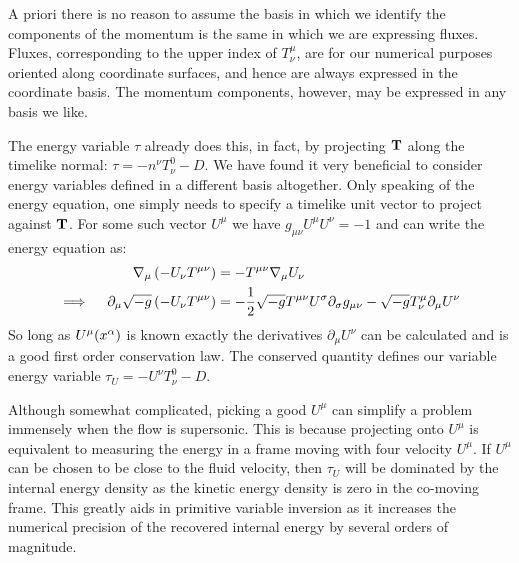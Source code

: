 A priori there is no reason to assume the basis in which we identify the components of the momentum is the same in which we are expressing fluxes.  Fluxes, corresponding to the upper index of $T^\mu_\nu$, are for our numerical purposes oriented along coordinate surfaces, and hence are always expressed in the coordinate basis.  The momentum components, however, may be expressed in any basis we like.  

The energy variable $\tau$ already does this, in fact, by projecting ${\bf T}$ along the timelike normal: $\tau = -n^\nu T^0_\nu - D$.  We have found it very beneficial to consider energy variables defined in a different basis altogether.  Only speaking of the energy equation, one simply needs to specify a timelike unit vector to project against ${\bf T}$.  For some such vector $U^\mu$ we have $g_{\mu\nu}U^\mu U^\nu = -1$ and can write the energy equation as:
\begin{align}
	\nabla_\mu \left( -U_\nu T^{\mu\nu}\right) &= -T^{\mu\nu}\nabla_\mu U_\nu \\
\implies \quad	\partial_\mu \sqrt{-g} \left(-U_\nu T^{\mu\nu}\right) &= -\frac{1}{2}\sqrt{-g}T^{\mu\nu}U^\sig\partial_\sig g_{\mu\nu} - \sqrt{-g}T^\mu_\nu \partial_\mu U^\nu \eqlabel{UTmunu}
\end{align}
So long as $U^\mu(x^\alpha)$ is known exactly the derivatives $\partial_\mu U^\nu$ can be calculated and  is a good first order conservation law.  The conserved quantity defines our variable energy variable $\tau_U = -U^\nu T^0_\nu - D$.

Although somewhat complicated, picking a good $U^\mu$ can simplify a problem immensely when the flow is supersonic.  This is because projecting onto $U^\mu$ is equivalent to measuring the energy in a frame moving with four velocity $U^\mu$.  If $U^\mu$ can be chosen to be close to the fluid velocity, then $\tau_U$ will be dominated by the internal energy density as the kinetic energy density is zero in the co-moving frame.  This greatly aids in primitive variable inversion as it increases the numerical precision of the recovered internal energy by several orders of magnitude.

